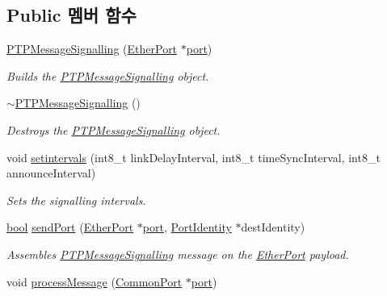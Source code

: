 \subsection*{Public 멤버 함수}
\begin{DoxyCompactItemize}
\item 
\hyperlink{class_p_t_p_message_signalling_a6bc8cdf12d5ae65235b49034977767ef}{P\+T\+P\+Message\+Signalling} (\hyperlink{class_ether_port}{Ether\+Port} $\ast$\hyperlink{gst__avb__playbin_8c_a63c89c04d1feae07ca35558055155ffb}{port})
\begin{DoxyCompactList}\small\item\em Builds the \hyperlink{class_p_t_p_message_signalling}{P\+T\+P\+Message\+Signalling} object. \end{DoxyCompactList}\item 
\hyperlink{class_p_t_p_message_signalling_ab8ff37bbffb844c501d5e91b49325db7}{$\sim$\+P\+T\+P\+Message\+Signalling} ()
\begin{DoxyCompactList}\small\item\em Destroys the \hyperlink{class_p_t_p_message_signalling}{P\+T\+P\+Message\+Signalling} object. \end{DoxyCompactList}\item 
void \hyperlink{class_p_t_p_message_signalling_a1b9bbfe9bf03aad89a23e56d065e714c}{setintervals} (int8\+\_\+t link\+Delay\+Interval, int8\+\_\+t time\+Sync\+Interval, int8\+\_\+t announce\+Interval)
\begin{DoxyCompactList}\small\item\em Sets the signalling intervals. \end{DoxyCompactList}\item 
\hyperlink{avb__gptp_8h_af6a258d8f3ee5206d682d799316314b1}{bool} \hyperlink{class_p_t_p_message_signalling_a0c6f07200fa46634360d356ebb10dfe0}{send\+Port} (\hyperlink{class_ether_port}{Ether\+Port} $\ast$\hyperlink{gst__avb__playbin_8c_a63c89c04d1feae07ca35558055155ffb}{port}, \hyperlink{class_port_identity}{Port\+Identity} $\ast$dest\+Identity)
\begin{DoxyCompactList}\small\item\em Assembles \hyperlink{class_p_t_p_message_signalling}{P\+T\+P\+Message\+Signalling} message on the \hyperlink{class_ether_port}{Ether\+Port} payload. \end{DoxyCompactList}\item 
void \hyperlink{class_p_t_p_message_signalling_a45670a42f5684252d52543f9ed3a1551}{process\+Message} (\hyperlink{class_common_port}{Common\+Port} $\ast$\hyperlink{gst__avb__playbin_8c_a63c89c04d1feae07ca35558055155ffb}{port})

\end{DoxyCompactItemize}
